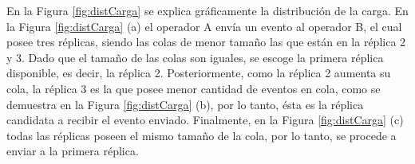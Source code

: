 En la Figura \ref{fig:distCarga} se explica gráficamente la distribución de la carga. En la Figura \ref{fig:distCarga} (a) el operador A envía un evento al operador B, el cual posee tres réplicas, siendo \normalsize{las colas de menor tamaño} las que están en la réplica 2 y 3. Dado que el tamaño de las colas son iguales, se escoge la primera réplica disponible, es decir, la réplica 2. Posteriormente, como la réplica 2 aumenta su cola, la réplica 3 es la que posee menor cantidad de eventos en cola, como se demuestra en la Figura \ref{fig:distCarga} (b), por lo tanto, ésta es la réplica candidata a recibir el evento enviado. Finalmente, en la Figura \ref{fig:distCarga} (c) todas las réplicas poseen el mismo tamaño de la cola, por lo tanto, se procede a enviar a la primera réplica.

\begin{figure}[!ht]
	\centering
	\captionsetup{justification=centering}

\end{figure}
